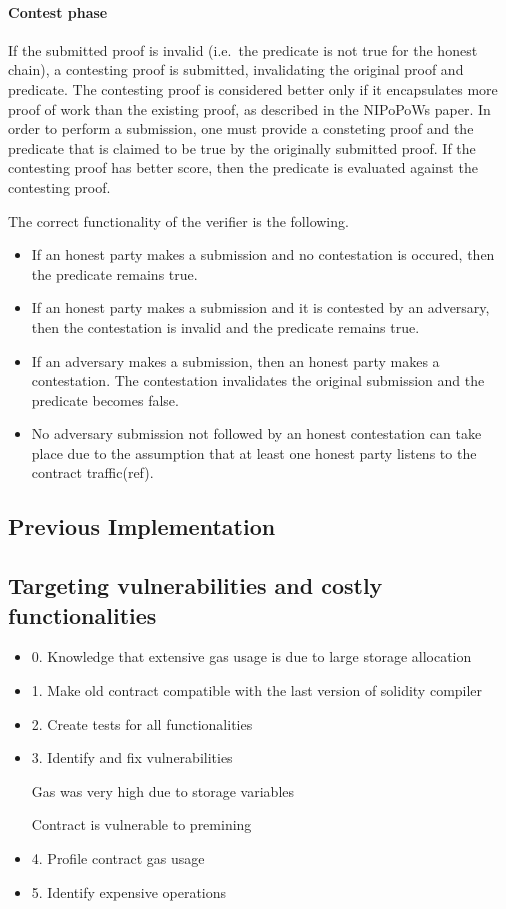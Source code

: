 \paragraph{Contest phase} If the submitted proof is invalid (i.e.\ the
predicate is not true for the honest chain), a contesting proof is
submitted, invalidating the original proof and predicate. The
contesting proof is considered better only if it encapsulates more
proof of work than the existing proof, as described in the NIPoPoWs
paper. In order to perform a submission, one must provide a consteting
proof and the predicate that is claimed to be true by the originally
submitted proof. If the contesting proof has better score, then the
predicate is evaluated against the contesting proof.

The correct functionality of the verifier is the following.
\begin{itemize}
    \item
        If an honest party makes a submission and no contestation is
        occured, then the predicate remains true.
    \item
        If an honest party makes a submission and it is contested by an
        adversary, then the contestation is invalid and the predicate
        remains true.
    \item
        If an adversary makes a submission, then an honest party makes a
        contestation. The contestation invalidates the original submission
        and the predicate becomes false.
    \item
        No adversary submission not followed by an honest contestation can
        take place due to the assumption that at least one honest party
        listens to the contract traffic(ref).
\end{itemize}

\subsection{Previous Implementation}

\subsection{Targeting vulnerabilities and costly functionalities}

\begin{itemize}
    \item
        0. Knowledge that extensive gas usage is due to large storage
        allocation
    \item
        1. Make old contract compatible with the last version of solidity
        compiler
    \item
        2. Create tests for all functionalities
    \item
        3. Identify and fix vulnerabilities

        Gas was very high due to storage variables

        Contract is vulnerable to premining
    \item
        4. Profile contract gas usage
    \item
        5. Identify expensive operations
\end{itemize}

